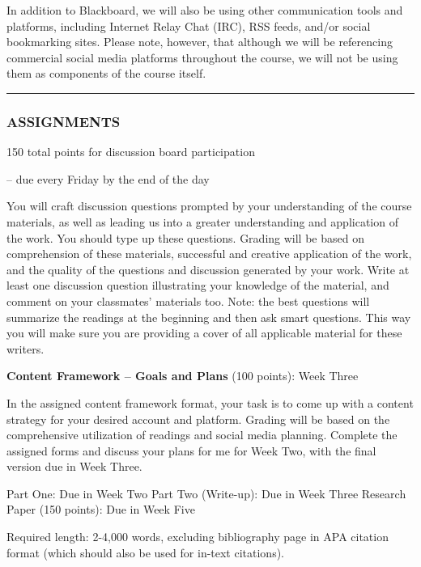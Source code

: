 \documentclass[]{tufte-handout}
\begin{document}
In addition to Blackboard, we will also be using other communication
tools and platforms, including Internet Relay Chat (IRC), RSS feeds,
and/or social bookmarking sites. Please note, however, that although we
will be referencing commercial social media platforms throughout the
course, we will not be using them as components of the course itself.

\begin{center}\rule{0.5\linewidth}{0.5pt}\end{center}

\hypertarget{assignments}{%
\subsubsection{ASSIGNMENTS}\label{assignments}}

150 total points for discussion board participation

-- due every Friday by the end of the day

You will craft discussion questions prompted by your understanding of
the course materials, as well as leading us into a greater understanding
and application of the work. You should type up these questions. Grading
will be based on comprehension of these materials, successful and
creative application of the work, and the quality of the questions and
discussion generated by your work. Write at least one discussion
question illustrating your knowledge of the material, and comment on
your classmates' materials too. Note: the best questions will summarize
the readings at the beginning and then ask smart questions. This way you
will make sure you are providing a cover of all applicable material for
these writers.

\textbf{Content Framework -- Goals and Plans} (100 points): Week Three

In the assigned content framework format, your task is to come up with a
content strategy for your desired account and platform. Grading will be
based on the comprehensive utilization of readings and social media
planning. Complete the assigned forms and discuss your plans for me for
Week Two, with the final version due in Week Three.

Part One: Due in Week Two Part Two (Write-up): Due in Week Three
Research Paper (150 points): Due in Week Five

Required length: 2-4,000 words, excluding bibliography page in APA
citation format (which should also be used for in-text citations).
\end{document}
